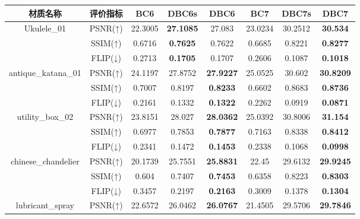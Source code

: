 \begin{table*}[htbp]
{    %
\begin{tabular}{cccccccc}
        \toprule
        材质名称                         &    评价指标     & BC6 & DBC6s & DBC6 & BC7 & DBC7s & DBC7 \\
        \midrule
        \multirow{3}{*}{Ukulele\_01}         & PSNR(↑) & 22.3005 & \textbf{27.1085} & 27.083 & 23.0234 & 30.2512 & \textbf{30.534} \\
                                             & SSIM(↑) & 0.6716 & \textbf{0.7625} & 0.7622 & 0.6685 & 0.8221 & \textbf{0.8277} \\
                                             & FLIP(↓) & 0.2713 & \textbf{0.1705} & 0.1707 & 0.2606 & 0.1087 & \textbf{0.1018} \\
        \midrule
        \multirow{3}{*}{antique\_katana\_01} & PSNR(↑) & 24.1197 & 27.8752 & \textbf{27.9227} & 25.0525 & 30.602 & \textbf{30.8209} \\
                                             & SSIM(↑) & 0.7007 & 0.8197 & \textbf{0.8233} & 0.6602 & 0.8683 & \textbf{0.8736} \\
                                             & FLIP(↓) & 0.2161 & 0.1332 & \textbf{0.1322} & 0.2262 & 0.0919 & \textbf{0.0871} \\
        \midrule
        \multirow{3}{*}{utility\_box\_02}    & PSNR(↑) & 23.8151 & 28.027 & \textbf{28.0362} & 25.0392 & 30.8006 & \textbf{31.154} \\
                                             & SSIM(↑) & 0.6977 & 0.7853 & \textbf{0.7877} & 0.7163 & 0.8338 & \textbf{0.8412} \\
                                             & FLIP(↓) & 0.2341 & 0.1472 & \textbf{0.1453} & 0.2338 & 0.1068 & \textbf{0.0998} \\
        \midrule
        \multirow{3}{*}{chinese\_chandelier}    & PSNR(↑) & 20.1739 & 25.7551 & \textbf{25.8831} & 22.45 & 29.6132 & \textbf{29.9245} \\
                                                & SSIM(↑) & 0.604 & 0.7407 & \textbf{0.7453} & 0.6358 & 0.8223 & \textbf{0.8303} \\
                                                & FLIP(↓) & 0.3457 & 0.2197 & \textbf{0.2163} & 0.3009 & 0.1378 & \textbf{0.1304} \\
        \midrule
        \multirow{3}{*}{lubricant\_spray}    & PSNR(↑) & 22.6572 & 26.0462 & \textbf{26.0767} & 21.4505 & 29.5706 & \textbf{29.7846} \\

\end{tabular}}
\end{table*}
